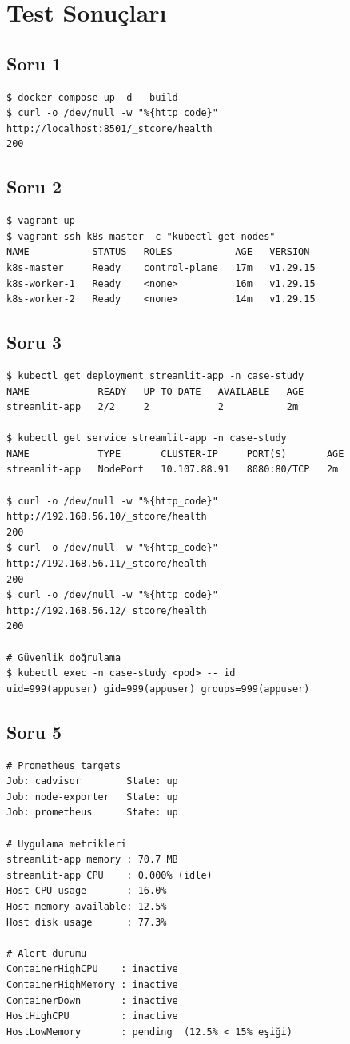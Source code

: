 \documentclass[12pt,a4paper]{article}
\begin{document}
\section{Test Sonuçları}

\subsection{Soru 1}
\begin{lstlisting}
$ docker compose up -d --build
$ curl -o /dev/null -w "%{http_code}" http://localhost:8501/_stcore/health
200
\end{lstlisting}

\subsection{Soru 2}
\begin{lstlisting}
$ vagrant up
$ vagrant ssh k8s-master -c "kubectl get nodes"
NAME           STATUS   ROLES           AGE   VERSION
k8s-master     Ready    control-plane   17m   v1.29.15
k8s-worker-1   Ready    <none>          16m   v1.29.15
k8s-worker-2   Ready    <none>          14m   v1.29.15
\end{lstlisting}

\subsection{Soru 3}
\begin{lstlisting}
$ kubectl get deployment streamlit-app -n case-study
NAME            READY   UP-TO-DATE   AVAILABLE   AGE
streamlit-app   2/2     2            2           2m

$ kubectl get service streamlit-app -n case-study
NAME            TYPE       CLUSTER-IP     PORT(S)       AGE
streamlit-app   NodePort   10.107.88.91   8080:80/TCP   2m

$ curl -o /dev/null -w "%{http_code}" http://192.168.56.10/_stcore/health
200
$ curl -o /dev/null -w "%{http_code}" http://192.168.56.11/_stcore/health
200
$ curl -o /dev/null -w "%{http_code}" http://192.168.56.12/_stcore/health
200

# Güvenlik doğrulama
$ kubectl exec -n case-study <pod> -- id
uid=999(appuser) gid=999(appuser) groups=999(appuser)
\end{lstlisting}

\subsection{Soru 5}
\begin{lstlisting}
# Prometheus targets
Job: cadvisor        State: up
Job: node-exporter   State: up
Job: prometheus      State: up

# Uygulama metrikleri
streamlit-app memory : 70.7 MB
streamlit-app CPU    : 0.000% (idle)
Host CPU usage       : 16.0%
Host memory available: 12.5%
Host disk usage      : 77.3%

# Alert durumu
ContainerHighCPU    : inactive
ContainerHighMemory : inactive
ContainerDown       : inactive
HostHighCPU         : inactive
HostLowMemory       : pending  (12.5% < 15% eşiği)
\end{lstlisting}
\end{document}

